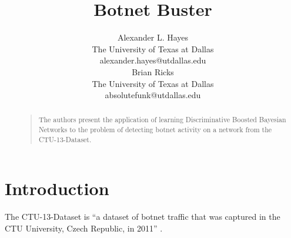 \documentclass[letterpaper]{article}
\begin{document}
%
\title{Botnet Buster}
\author{Alexander L. Hayes\\
The University of Texas at Dallas\\
alexander.hayes@utdallas.edu\\
\And
Brian Ricks\\
The University of Texas at Dallas\\
absolutefunk@utdallas.edu\\
}

\maketitle
\begin{abstract}
\begin{quote}
The authors present the application of learning Discriminative Boosted Bayesian Networks to the problem of detecting botnet activity on a network from the CTU-13-Dataset.
\end{quote}
\end{abstract}

\section{Introduction}

The CTU-13-Dataset is ``a dataset of botnet traffic that was captured in the CTU University, Czech Republic, in 2011'' \cite{garcia2014empirical}.



\end{document}
